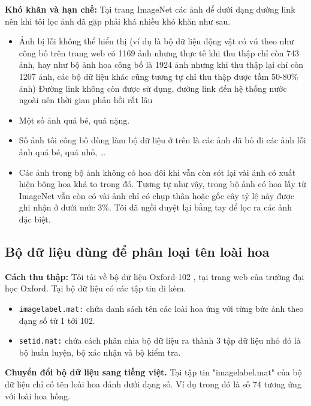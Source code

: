 \documentclass[12pt]{report}
\begin{document}
								
		\textbf{Khó khăn và hạn chế:} Tại trang ImageNet các ảnh để dưới dạng đường link nên khi tôi lọc ảnh đã gặp phải khá nhiều khó khăn như sau.
		\begin{itemize}
			\item Ảnh bị lỗi không thể hiển thị (ví dụ là bộ dữ liệu động vật có vú theo như công bố trên trang web có 1169 ảnh nhưng thực tế khi thu thập chỉ còn 743 ảnh, hay như bộ ảnh hoa công bố là 1924 ảnh nhưng khi thu thập lại chỉ còn 1207 ảnh, các bộ dữ liệu khác cũng tương tự chỉ thu thập được tầm 50-80\% ảnh) Đường link không còn được sử dụng, đường link đến hệ thống nước ngoài nên thời gian phản hồi rất lâu
			\item Một số ảnh quá bé, quá nặng.
			\item Số ảnh tôi công bố dùng làm bộ dữ liệu ở trên là các ảnh đã bỏ đi các ảnh lỗi ảnh quá bé, quá nhỏ, …
			\item Các ảnh trong bộ ảnh không có hoa đôi khi vẫn còn sót lại vài ảnh có xuất hiện bông hoa khá to trong đó. Tương tự như vậy, trong bộ ảnh có hoa lấy từ ImageNet vẫn còn có vài ảnh chỉ có chụp thân hoặc gốc cây tỷ lệ này được ghi nhận ở dưới mức 3\%. Tôi đã ngồi duyệt lại bằng tay để lọc ra các ảnh đặc biệt.
		\end{itemize}
								
									
		\subsection{Bộ dữ liệu dùng để phân loại tên loài hoa}
										
		\textbf{Cách thu thập:} Tôi tải về bộ dữ liệu Oxford-102 \cite{cia-Nilsback06}, tại trang web của trường đại học Oxford. Tại bộ dữ liệu có các tập tin đi kèm.
		\begin{itemize}
			\item \texttt{imagelabel.mat:} chứa danh sách tên các loài hoa ứng với từng bức ảnh theo dạng số từ 1 tới 102.
			\item \texttt{setid.mat:} chứa cách phân chia bộ dữ liệu ra thành 3 tập dữ liệu nhỏ đó là bộ huấn luyện, bộ xác nhận và bộ kiểm tra.
		\end{itemize}
								
		\textbf{Chuyển đổi bộ dữ liệu sang tiếng việt.}
		Tại tập tin "imagelabel.mat" của bộ dữ liệu chỉ có tên loài hoa đánh dưới dạng số. Ví dụ trong đó là số 74 tương ứng với loài hoa hồng.
								
\end{document}
